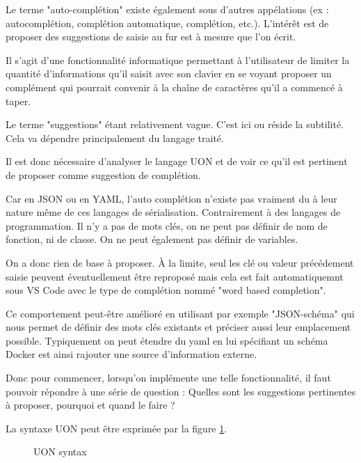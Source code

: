\documentclass[
    iict, %
    il, %
]{heig-tb}
\begin{document}
Le terme "auto-complétion" existe également sous d'autres appélations (ex : autocomplétion, complétion automatique, complétion, etc.).
L'intérêt est de proposer des suggestions de saisie au fur est à mesure que l'on écrit.

Il s'agit d'une fonctionnalité informatique permettant à l'utilisateur de limiter la quantité d'informations qu'il saisit avec son clavier
en se voyant proposer un complément qui pourrait convenir à la chaîne de caractères qu'il a commencé à taper.

Le terme "suggestions" étant relativement vague. C'est ici ou réside la subtilité. Cela va dépendre principalement du langage traité.

Il est donc nécessaire d'analyser le langage UON et de voir ce qu'il est pertinent de proposer comme suggestion de complétion.

Car en JSON ou en YAML, l'auto complétion n'existe pas vraiment du à leur nature même de ces langages de sérialisation.
Contrairement à des langages de programmation. Il n'y a pas de mots clés, on ne peut pas définir de nom de fonction, ni de classe. On ne peut également pas définir de variables.


On a donc rien de base à proposer. À la limite, seul les clé ou valeur précédement saisie peuvent éventuellement être reproposé mais cela est fait automatiquemnt sous VS Code
avec le type de complétion nommé "word based completion".

Ce comportement peut-être amélioré en utilisant par exemple "JSON-schéma" qui nous permet de définir des mots clés existants et préciser aussi leur emplacement possible.
Typiquement on peut étendre du yaml en lui spécifiant un schéma Docker est ainsi rajouter une source d'information externe.

Donc pour commencer, lorsqu'on implémente une telle fonctionnalité, il faut pouvoir répondre à une série de question :
Quelles sont les suggestions pertinentes à proposer, pourquoi et quand le faire ?

La syntaxe UON peut être exprimée par la figure \ref{syntax}.

\begin{figure}[!ht]
    \begin{center}
    \end{center}
    \caption[syntax]{\label{syntax} UON syntax}
\end{figure}
\end{document}
